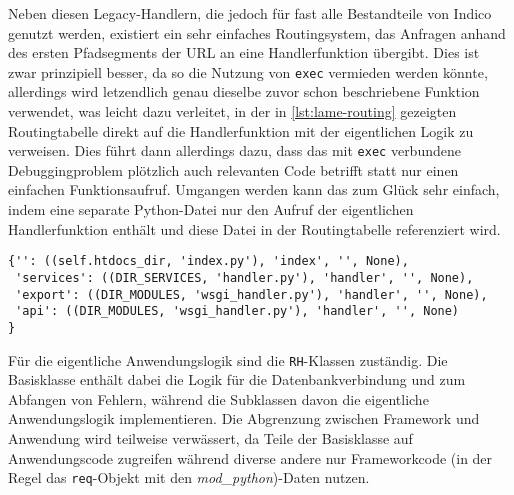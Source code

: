 Neben diesen Legacy-Handlern, die jedoch für fast alle Bestandteile von Indico genutzt werden,
existiert ein sehr einfaches Routingsystem, das Anfragen anhand des ersten Pfadsegments der URL an
eine Handlerfunktion übergibt. Dies ist zwar prinzipiell besser, da so die Nutzung von
\lstinline{exec} vermieden werden könnte, allerdings wird letzendlich genau dieselbe zuvor schon
beschriebene Funktion verwendet, was leicht dazu verleitet, in der in \autoref{lst:lame-routing}
gezeigten Routingtabelle direkt auf die Handlerfunktion mit der eigentlichen Logik zu verweisen.
Dies führt dann allerdings dazu, dass das mit \lstinline{exec} verbundene Debuggingproblem plötzlich
auch relevanten Code betrifft statt nur einen einfachen Funktionsaufruf. Umgangen werden kann das
zum Glück sehr einfach, indem eine separate Python-Datei nur den Aufruf der eigentlichen
Handlerfunktion enthält und diese Datei in der Routingtabelle referenziert wird.

\begin{lstlisting}[caption=Einfaches URL-Routing,label=lst:lame-routing]
{'': ((self.htdocs_dir, 'index.py'), 'index', '', None),
 'services': ((DIR_SERVICES, 'handler.py'), 'handler', '', None),
 'export': ((DIR_MODULES, 'wsgi_handler.py'), 'handler', '', None),
 'api': ((DIR_MODULES, 'wsgi_handler.py'), 'handler', '', None)
}
\end{lstlisting}

Für die eigentliche Anwendungslogik sind die \lstinline{RH}-Klassen zuständig. Die Basisklasse
enthält dabei die Logik für die Datenbankverbindung und zum Abfangen von Fehlern, während die
Subklassen davon die eigentliche Anwendungslogik implementieren. Die Abgrenzung zwischen Framework
und Anwendung wird teilweise verwässert, da Teile der Basisklasse auf Anwendungscode zugreifen
während diverse andere nur Frameworkcode (in der Regel das \lstinline{req}-Objekt mit den
\emph{mod\_python})-Daten nutzen.

